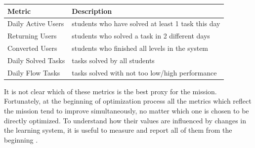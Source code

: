 \begin{table}[htb]
\centering
\begin{tabular}{l l}
\toprule
Metric & Description \\
\midrule
Daily Active Users & students who have solved at least 1 task this day \\
Returning Users & students who solved a task in 2 different days \\
Converted Users & students who finished all levels in the system \\
Daily Solved Tasks & tasks solved by all students \\
Daily Flow Tasks & tasks solved with not too low/high performance \\
\bottomrule
\end{tabular}
\label{tbl:long-term-metrics}
\end{table}

It is not clear which of these metrics is the best proxy for the mission.
Fortunately, at the beginning of optimization process all the metrics
which reflect the mission tend to improve simultaneously, no matter which one
is chosen to be directly optimized.
To understand how their values are influenced by changes in the learning system,
it is useful to measure and report all of them from the beginning
\cite[][Rule 2, 12]{google-ml-rules}.




